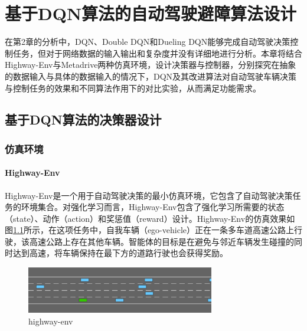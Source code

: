 %
%
%
%
%

\chapter{基于DQN算法的自动驾驶避障算法设计}

在第2章的分析中，DQN、Double DQN和Dueling DQN能够完成自动驾驶决策控制任务，但对于网络数据的输入输出和复杂度并没有详细地进行分析。本章将结合Highway-Env与Metadrive两种仿真环境，设计决策器与控制器，分别探究在抽象的数据输入与具体的数据输入的情况下，DQN及其改进算法对自动驾驶车辆决策与控制任务的效果和不同算法作用下的对比实验，从而满足功能需求。

\section{基于DQN算法的决策器设计} %

\subsection{仿真环境}

\subsubsection{Highway-Env}

Highway-Env是一个用于自动驾驶决策的最小仿真环境\cite{highway-env}，它包含了自动驾驶决策任务的环境集合。对强化学习而言，Highway-Env包含了强化学习所需要的状态（state）、动作（action）和奖惩值（reward）设计。Highway-Env的仿真效果如图\ref{highway-env}所示，在这项任务中，自我车辆（ego-vehicle）正在一条多车道高速公路上行驶，该高速公路上存在其他车辆。智能体的目标是在避免与邻近车辆发生碰撞的同时达到高速，将车辆保持在最下方的道路行驶也会获得奖励。

\begin{figure}[htbp]
    \vspace{13pt}
    \centering
    \includegraphics[width=0.73\textwidth]{images/chapter3/highway-env.png}
    \caption{highway-env}\label{highway-env} %
\end{figure}  

